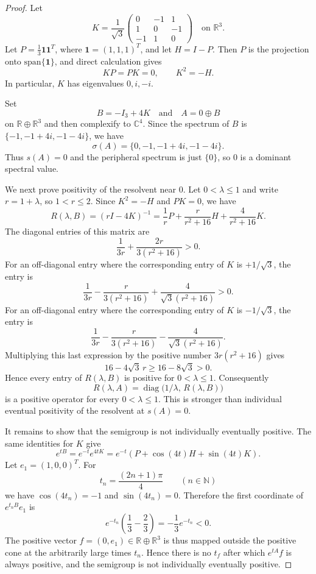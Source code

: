 \documentclass[11pt]{article}
\newcommand{\R}{\mathbb R}
\newcommand{\C}{\mathbb C}
\newcommand{\one}{\mathbf 1}
\newcommand{\spb}{s}
\newcommand{\spec}{\sigma}
\newcommand{\diag}{\operatorname{diag}}
\begin{document}
\begin{proof}
Let
\[
K=\frac1{\sqrt3}
\begin{pmatrix}
0&-1&1\\
1&0&-1\\
-1&1&0
\end{pmatrix}
\quad\text{on }\R^3.
\]
Let $P=\frac13 \one\one^T$, where $\one=(1,1,1)^T$, and let $H=I-P$.
Then $P$ is the projection onto $\mathrm{span}\{\one\}$, and direct
calculation gives
\[
  KP=PK=0,\qquad K^2=-H.
\]
In particular, $K$ has eigenvalues $0,i,-i$.

Set
\[
  B=-I_3+4K
\quad\text{and}\quad
  A=0\oplus B
\]
on $\R\oplus\R^3$ and then complexify to $\C^4$. Since the spectrum of
$B$ is $\{-1,-1+4i,-1-4i\}$, we have
\[
  \spec(A)=\{0,-1,-1+4i,-1-4i\}.
\]
Thus $\spb(A)=0$ and the peripheral spectrum is just $\{0\}$, so $0$ is
a dominant spectral value.

We next prove positivity of the resolvent near $0$. Let $0<\lambda\leq 1$ and
write $r=1+\lambda$, so $1<r\leq 2$. Since $K^2=-H$ and $PK=0$, we have
\[
  R(\lambda,B)=(rI-4K)^{-1}
  =\frac1r P+\frac{r}{r^2+16}H+\frac4{r^2+16}K.
\]
The diagonal entries of this matrix are
\[
  \frac1{3r}+\frac{2r}{3(r^2+16)}>0.
\]
For an off-diagonal entry where the corresponding entry of $K$ is
$+1/\sqrt3$, the entry is
\[
  \frac1{3r}-\frac{r}{3(r^2+16)}+\frac4{\sqrt3(r^2+16)}>0.
\]
For an off-diagonal entry where the corresponding entry of $K$ is
$-1/\sqrt3$, the entry is
\[
  \frac1{3r}-\frac{r}{3(r^2+16)}-\frac4{\sqrt3(r^2+16)}.
\]
Multiplying this last expression by the positive number $3r(r^2+16)$ gives
\[
  16-4\sqrt3\,r \geq 16-8\sqrt3>0.
\]
Hence every entry of $R(\lambda,B)$ is positive for $0<\lambda\leq 1$.
Consequently
\[
  R(\lambda,A)=\diag\bigl(1/\lambda,\,R(\lambda,B)\bigr)
\]
is a positive operator for every $0<\lambda\leq 1$. This is stronger than
individual eventual positivity of the resolvent at $\spb(A)=0$.

It remains to show that the semigroup is not individually eventually positive.
The same identities for $K$ give
\[
  e^{tB}=e^{-t}e^{4tK}
  =e^{-t}\left(P+\cos(4t)H+\sin(4t)K\right).
\]
Let $e_1=(1,0,0)^T$. For
\[
  t_n=\frac{(2n+1)\pi}{4}\qquad(n\in\mathbb N)
\]
we have $\cos(4t_n)=-1$ and $\sin(4t_n)=0$. Therefore the first coordinate of
$e^{t_nB}e_1$ is
\[
  e^{-t_n}\left(\frac13-\frac23\right)=-\frac13e^{-t_n}<0.
\]
The positive vector $f=(0,e_1)\in\R\oplus\R^3$ is thus mapped outside the
positive cone at the arbitrarily large times $t_n$. Hence there is no
$t_f$ after which $e^{tA}f$ is always positive, and the semigroup is not
individually eventually positive.
\end{proof}
\end{document}
